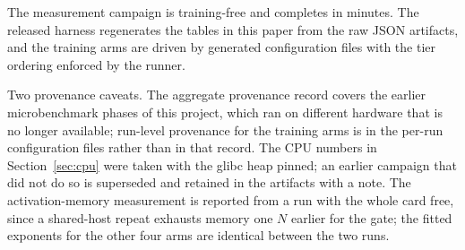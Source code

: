 The measurement campaign is training-free and completes in minutes. The
released harness regenerates the tables in this paper from the raw JSON
artifacts, and the training arms are driven by generated configuration files
with the tier ordering enforced by the runner.

Two provenance caveats. The aggregate provenance record covers the earlier
microbenchmark phases of this project, which ran on different hardware that is
no longer available; run-level provenance for the training arms is in the
per-run configuration files rather than in that record. The CPU numbers in Section~\ref{sec:cpu} were taken with the glibc heap
pinned; an earlier campaign that did not do so is superseded and retained in the
artifacts with a note. The activation-memory measurement is reported from a run
with the whole card free, since a shared-host repeat exhausts memory one $N$
earlier for the gate; the fitted exponents for the other four arms are identical
between the two runs.

